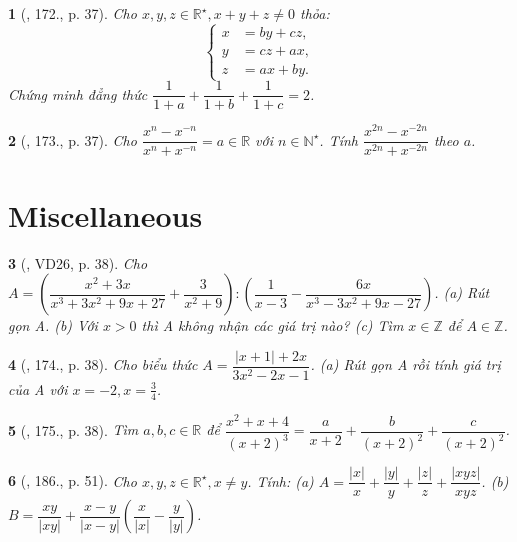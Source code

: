 \documentclass{article}
\newtheorem{baitoan}{}
\begin{document}
\begin{baitoan}[\cite{Tuyen_Toan_8}, 172., p. 37]
	Cho $x,y,z\in\mathbb{R}^\star,x + y + z\ne0$ thỏa:
	\begin{equation*}
		\left\{\begin{split}
			x &= by + cz,\\
			y &= cz + ax,\\
			z &= ax + by.
		\end{split}\right.
	\end{equation*}
	Chứng minh đẳng thức $\dfrac{1}{1 + a} + \dfrac{1}{1 + b} + \dfrac{1}{1 + c} = 2$.
\end{baitoan}

\begin{baitoan}[\cite{Tuyen_Toan_8}, 173., p. 37]
	Cho $\dfrac{x^n - x^{-n}}{x^n + x^{-n}} = a\in\mathbb{R}$ với $n\in\mathbb{N}^\star$. Tính $\dfrac{x^{2n} - x^{-2n}}{x^{2n} + x^{-2n}}$ theo $a$.
\end{baitoan}


\section{Miscellaneous}

\begin{baitoan}[\cite{Tuyen_Toan_8}, VD26, p. 38]
	Cho $A = \left(\dfrac{x^2 + 3x}{x^3 + 3x^2 + 9x + 27} + \dfrac{3}{x^2 + 9}\right):\left(\dfrac{1}{x - 3} - \dfrac{6x}{x^3 - 3x^2 + 9x - 27}\right)$. (a) Rút gọn A. (b) Với $x > 0$ thì A không nhận các giá trị nào? (c) Tìm $x\in\mathbb{Z}$ để $A\in\mathbb{Z}$.
\end{baitoan}

\begin{baitoan}[\cite{Tuyen_Toan_8}, 174., p. 38]
	Cho biểu thức $A = \dfrac{|x + 1| + 2x}{3x^2 - 2x - 1}$. (a) Rút gọn A rồi tính giá trị của A với $x = -2,x = \frac{3}{4}$.
\end{baitoan}

\begin{baitoan}[\cite{Tuyen_Toan_8}, 175., p. 38]
	Tìm $a,b,c\in\mathbb{R}$ để $\dfrac{x^2 + x + 4}{(x + 2)^3} = \dfrac{a}{x + 2} + \dfrac{b}{(x + 2)^2} + \dfrac{c}{(x + 2)^2}$.
\end{baitoan}

\begin{baitoan}[\cite{Tuyen_Toan_8_old}, 186., p. 51]
	Cho $x,y,z\in\mathbb{R}^\star,x\ne y$. Tính: (a) $A = \dfrac{|x|}{x} + \dfrac{|y|}{y} + \dfrac{|z|}{z} + \dfrac{|xyz|}{xyz}$. (b) $B = \dfrac{xy}{|xy|} + \dfrac{x - y}{|x - y|}\left(\dfrac{x}{|x|} - \dfrac{y}{|y|}\right)$.
\end{baitoan}
\end{document}
